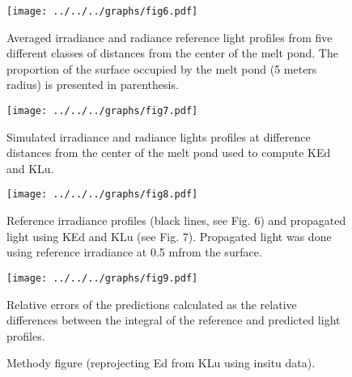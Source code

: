 \documentclass[12pt,a4paper]{scrartcl}
\begin{document}
    \clearpage
    \newpage

    \begin{figure}[ht]
        \centering
        \texttt{[image: ../../../graphs/fig6.pdf]}
        \caption{Averaged irradiance and radiance reference light profiles from five different classes of distances from the center of the melt pond. The proportion of the surface occupied by the melt pond (5 meters radius) is presented in parenthesis.}
    \end{figure}

    \clearpage
    \newpage

    \begin{figure}[ht]
        \centering
        \texttt{[image: ../../../graphs/fig7.pdf]}
        \caption{Simulated irradiance and radiance lights profiles at difference distances from the center of the melt pond used to compute KEd and KLu.}
    \end{figure}

    \clearpage
    \newpage

    \begin{figure}[ht]
        \centering
        \texttt{[image: ../../../graphs/fig8.pdf]}
        \caption{Reference irradiance profiles (black lines, see Fig. 6) and propagated light using KEd and KLu (see Fig. 7). Propagated light was done using reference irradiance at 0.5 mfrom the surface.}
    \end{figure}

    \clearpage
    \newpage

    \begin{figure}[ht]
        \centering
        \texttt{[image: ../../../graphs/fig9.pdf]}
        \caption{Relative errors of the predictions calculated as the relative differences between the integral of the reference and predicted light profiles.}
    \end{figure}

    \clearpage
    \newpage

    \begin{figure}[ht]
        \centering
        \caption{Methody figure (reprojecting Ed from KLu using insitu data).}
    \end{figure}
\end{document}
